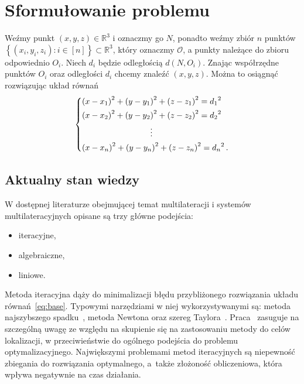 \chapter{Sformułowanie problemu}\label{chap:problem}

Weźmy punkt $(x, y, z) \in \mathbb{R}^3$ i oznaczmy go $N$, ponadto weźmy zbiór $n$ punktów $\left\{(x_i, y_i, z_i): i \in [n]\right\} \subset \mathbb{R}^3$, który oznaczmy $\mathcal{O}$, a punkty należące do zbioru odpowiednio $O_i$. Niech $d_i$ będzie odległością $d(N, O_i)$. Znając współrzędne punktów $O_i$ oraz odległości $d_i$ chcemy znaleźć $(x, y, z)$. Można to osiągnąć rozwiązując układ równań
\begin{equation}\label{eq:base}
    \begin{dcases}
        {(x - x_1)}^2 + {(y - y_1)}^2 + {(z - z_1)}^2 = {d_1}^2 \\
        {(x - x_2)}^2 + {(y - y_2)}^2 + {(z - z_2)}^2 = {d_2}^2 \\
        \mspace{150mu}\vdots                                    \\
        {(x - x_n)}^2 + {(y - y_n)}^2 + {(z - z_n)}^2 = {d_n}^2\,.
    \end{dcases}
\end{equation}

\section{Aktualny stan wiedzy}

W dostępnej literaturze obejmującej temat multilateracji i systemów multilateracyjnych opisane są trzy główne podejścia:

\begin{itemize}
    \item iteracyjne,
    \item algebraiczne,
    \item liniowe.
\end{itemize}

Metoda iteracyjna dąży do minimalizacji błędu przybliżonego rozwiązania układu równań~\ref{eq:base}. Typowymi narzędziami w niej wykorzystywanymi są: metoda najszybszego spadku~\cite{doi:10.1137/0111030}, metoda Newtona oraz szereg Taylora~\cite{4101619}. Praca~\cite{4101619} zasuguje na szczególną uwagę ze względu na skupienie się na zastosowaniu metody do celów lokalizacji, w przeciwieństwie do ogólnego podejścia do problemu optymalizacyjnego. Największymi problemami metod iteracyjnych są niepewność zbiegania do rozwiązania optymalnego, a~także złożoność obliczeniowa, która wpływa negatywnie na czas działania.

